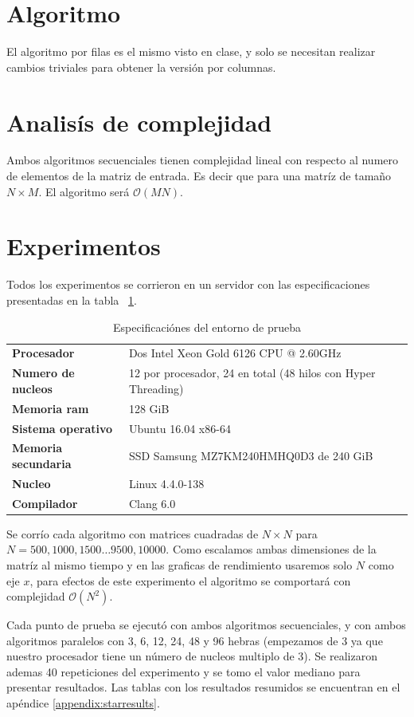 \documentclass{report}
\begin{document}
\section{Algoritmo}

El algoritmo por filas es el mismo visto en clase, y solo se necesitan
realizar cambios triviales para obtener la versión por columnas.

\section{Analis\'is de complejidad}

Ambos algoritmos secuenciales tienen complejidad lineal con respecto al numero
de elementos de la matriz de entrada. Es decir que para una matr\'iz de tamaño
$N \times M$. El algoritmo ser\'a $\mathcal{O}(MN)$.

\section{Experimentos}

Todos los experimentos se corrieron en un servidor con las especificaciones presentadas en la tabla
~\ref{table:testspecs}.

\begin{table}[H]
  \begin{tabular}{ >{\bf}l l }
  Procesador & Dos Intel Xeon Gold 6126 CPU @ 2.60GHz \\
  Numero de nucleos & 12 por procesador, 24 en total (48 hilos con Hyper Threading) \\
  Memoria ram & 128 GiB \\
  Sistema operativo & Ubuntu 16.04 x86-64 \\
  Memoria secundaria & SSD Samsung MZ7KM240HMHQ0D3 de 240 GiB\\
  Nucleo & Linux 4.4.0-138 \\
  Compilador & Clang 6.0
\end{tabular}
\caption{Especificaciónes del entorno de prueba}
\label{table:testspecs}
\end{table}

Se corr\'io cada algoritmo con matrices cuadradas de $N \times N$  para 
$N = 500, 1000, 1500 \ldots 9500, 10000 $. Como escalamos ambas
dimensiones de la matr\'iz al mismo tiempo y en las graficas de
rendimiento usaremos solo $N$ como eje $x$, para efectos de este experimento
el algoritmo se comportar\'a con complejidad $\mathcal{O}(N^2)$.

Cada punto de prueba se ejecut\'o con ambos algoritmos secuenciales, y
con ambos algoritmos paralelos con 3, 6, 12, 24, 48 y 96 hebras (empezamos de
3 ya que nuestro procesador tiene un n\'umero de nucleos multiplo de 3). Se
realizaron ademas 40 repeticiones del experimento y se tomo el valor mediano
para presentar resultados. Las tablas con los resultados resumidos se encuentran
en el ap\'endice \ref{appendix:starresults}.
\end{document}
